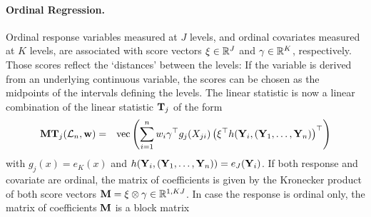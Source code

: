 \documentclass[letter]{article}
\begin{document}
\paragraph{Ordinal Regression.}
Ordinal response variables measured at $J$ levels, and ordinal covariates
measured at $K$ levels, are associated with score vectors $\xi \in
\mathbb{R}^J$ and $\gamma \in \mathbb{R}^K$, respectively. Those scores reflect the
`distances' between the levels: If the variable is derived from an
underlying continuous variable, the scores can be chosen as the midpoints
of the intervals defining the levels. The linear statistic is now a linear
combination of the linear statistic $\mathbf{T}_j$ of the form
\begin{eqnarray*}
\mathbf{M} \mathbf{T}_j(\mathcal{L}_n, \mathbf{w}) & = & \text{vec} \left( \sum_{i=1}^n w_i \gamma^\top g_j(X_{ji})
            \left(\xi^\top h(\mathbf{Y}_i, (\mathbf{Y}_1, \dots, \mathbf{Y}_n)\right)^\top \right)
\end{eqnarray*}
with $g_j(x) = e_K(x)$ and $h(\mathbf{Y}_i, (\mathbf{Y}_1, \dots, \mathbf{Y}_n)) = e_J(\mathbf{Y}_i)$.
If both response and covariate are ordinal, the matrix of coefficients
is given by the Kronecker product of both score vectors $\mathbf{M} = \xi \otimes \gamma \in
\mathbb{R}^{1, KJ}$. In case the response is ordinal only, the matrix of 
coefficients $\mathbf{M}$ is a block matrix 
\end{document}
